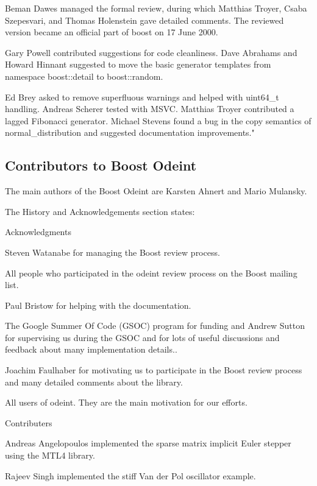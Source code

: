 \vpara
Beman Dawes managed the formal review, during which Matthias Troyer, Csaba Szepesvari, and Thomas Holenstein gave detailed comments. The reviewed version became an official part of boost on 17 June 2000. 

\vpara
Gary Powell contributed suggestions for code cleanliness. Dave Abrahams and Howard Hinnant suggested to move the basic generator templates from namespace boost::detail to boost::random. 

\vpara
Ed Brey asked to remove superfluous warnings and helped with uint64\_t handling. Andreas Scherer tested with MSVC. Matthias Troyer contributed a lagged Fibonacci generator. Michael Stevens found a bug in the copy semantics of normal\_distribution and suggested documentation improvements."







\subsection{Contributors to Boost Odeint}
\label{Contributors to Boost Odeint}
The main authors of the Boost Odeint are Karsten Ahnert  and Mario Mulansky.

\vpara
The History and Acknowledgements section states:

\vpara
Acknowledgments 

Steven Watanabe for managing the Boost review process. 

All people who participated in the odeint review process on the Boost mailing list. 

Paul Bristow for helping with the documentation. 

The Google Summer Of Code (GSOC) program for funding and Andrew Sutton for supervising us during the GSOC and for lots of useful discussions and feedback about many implementation details.. 

Joachim Faulhaber for motivating us to participate in the Boost review process and many detailed comments about the library. 

All users of odeint. They are the main motivation for our efforts. 

\vpara
 Contributers 

Andreas Angelopoulos implemented the sparse matrix implicit Euler stepper using the MTL4 library. 

Rajeev Singh implemented the stiff Van der Pol oscillator example. 

